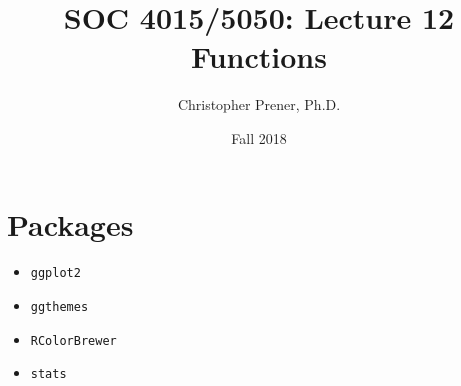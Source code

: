 \documentclass{tufte-handout}
\title{SOC 4015/5050: Lecture 12 Functions}
\author{Christopher Prener, Ph.D.}
\date{Fall 2018}
\begin{document}
\maketitle %

\vspace{5mm}
\section{Packages}
\begin{itemize}
\item \texttt{ggplot2}
\item \texttt{ggthemes}
\item \texttt{RColorBrewer}
\item \texttt{stats}
\end{itemize}

\vspace{5mm}
\end{document}
